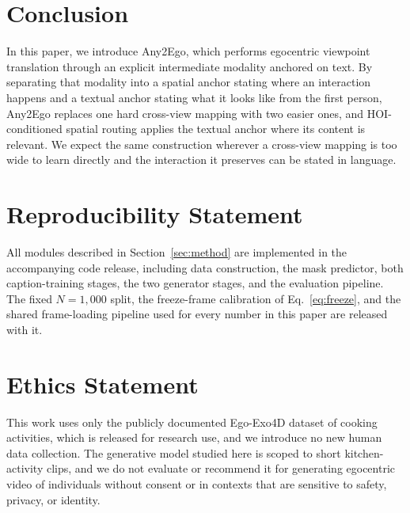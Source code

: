 \documentclass{article}
\begin{document}
\section{Conclusion}
\label{sec:conclusion}

In this paper, we introduce Any2Ego, which performs egocentric viewpoint
translation through an explicit intermediate modality anchored on text. By
separating that modality into a spatial anchor stating where an interaction
happens and a textual anchor stating what it looks like from the first person,
Any2Ego replaces one hard cross-view mapping with two easier ones, and
HOI-conditioned spatial routing applies the textual anchor where its content is
relevant. We expect the same construction wherever a cross-view mapping is too
wide to learn directly and the interaction it preserves can be stated in
language.

\section*{Reproducibility Statement}

All modules described in Section~\ref{sec:method} are implemented in the
accompanying code release, including data construction, the mask predictor,
both caption-training stages, the two generator stages, and the evaluation
pipeline. The fixed $N{=}1{,}000$ split, the freeze-frame calibration of
Eq.~\ref{eq:freeze}, and the shared frame-loading pipeline used for every
number in this paper are released with it.

\section*{Ethics Statement}

This work uses only the publicly documented Ego-Exo4D dataset of cooking
activities, which is released for research use, and we introduce no new human
data collection. The generative model studied here is scoped to short
kitchen-activity clips, and we do not evaluate or recommend it for generating
egocentric video of individuals without consent or in contexts that are
sensitive to safety, privacy, or identity.
\end{document}

